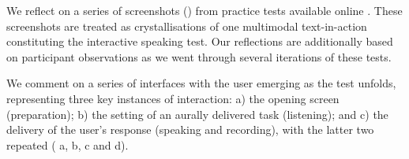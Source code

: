 \documentclass[english]{textolivre}
\begin{document}
We reflect on a series of screenshots () from practice tests available online \cite{park2025assessing}. These screenshots are treated as crystallisations of one multimodal text-in-action constituting the interactive speaking test. Our reflections are additionally based on participant observations as we went through several iterations of these tests.

We comment on a series of interfaces with the user emerging as the test unfolds, representing three key instances of interaction: a) the opening screen (preparation); b) the setting of an aurally delivered task (listening); and c) the delivery of the user’s response (speaking and recording), with the latter two repeated ( a, b, c and d).


\end{document}
